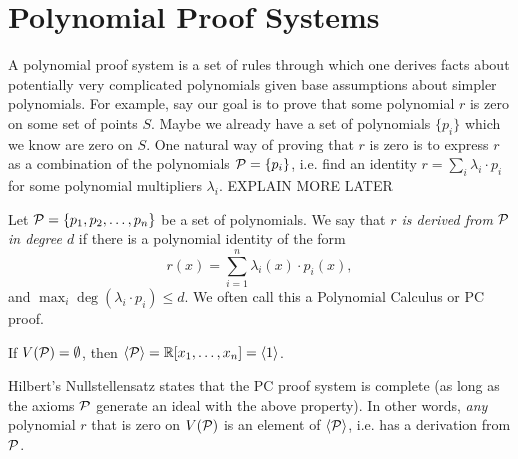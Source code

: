 \section{Polynomial Proof Systems}
A polynomial proof system is a set of rules through which one derives facts about potentially very complicated polynomials given base assumptions about simpler polynomials. For example, say our goal is to prove that some polynomial $r$ is zero on some set of points $S$. Maybe we already have a set of polynomials $\{p_i\}$ which we know are zero on $S$. One natural way of proving that $r$ is zero is to express $r$ as a combination of the polynomials $\mathcal P = \{p_i\}$, i.e. find an identity $r = \sum_i \lambda_i \cdot p_i$ for some polynomial multipliers $\lambda_i$. EXPLAIN MORE LATER

\begin{definition}
Let $\cP = \{p_1, p_2, \dots, p_n\}$ be a set of polynomials. We say that \emph{$r$ is derived from $\cP$ in degree $d$} if there is a polynomial identity of the form
\[r(x) = \sum_{i=1}^n \lambda_i(x) \cdot p_i(x),\]
and $\max_i \deg(\lambda_i \cdot p_i) \leq d$. We often call this a Polynomial Calculus or PC proof.
\end{definition}
\begin{theorem}[Hilbert's Nullstellensatz]
Let $\cP$ be such that if $r^k \in \gen{\cP}$ for some $k \in \Z$, then $r \in \gen{\cP$. Then $\gen{\cP} = I(V(\cP))$.
\end{theorem}
\begin{corollary}
If $V(\cP) = \emptyset$, then $\gen{\cP} = \R[x_1,\dots,x_n] = \gen{1}$.
\end{corollary}
Hilbert's Nullstellensatz states that the PC proof system is complete (as long as the axioms $\cP$ generate an ideal with the above property). In other words, \emph{any} polynomial $r$ that is zero on $V(\cP)$ is an element of $\gen{\cP}$, i.e. has a derivation from $\cP$. 


